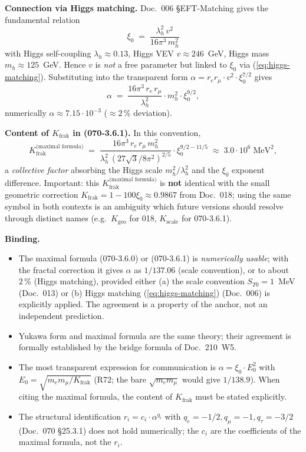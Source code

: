 \textbf{Connection via Higgs matching.}
Doc.~006 §EFT-Matching gives the fundamental relation
\begin{equation}
  \xi_0 \;=\; \frac{\lambda_h^2\, v^2}{16\pi^3\, m_h^2}
  \label{eq:higgs-matching}
\end{equation}
with Higgs self-coupling $\lambda_h \approx 0.13$, Higgs VEV
$v \approx 246$~GeV, Higgs mass $m_h \approx 125$~GeV. Hence $v$ is
\emph{not} a free parameter but linked to $\xi_0$ via
(\ref{eq:higgs-matching}). Substituting into the transparent form
$\alpha = r_e r_\mu \cdot v^2 \cdot \xi_0^{7/2}$ gives
\begin{equation}
  \alpha \;=\;
  \frac{16\pi^3\,r_e\,r_\mu}{\lambda_h^2}
  \cdot m_h^2 \cdot \xi_0^{9/2},
\end{equation}
numerically $\alpha \approx 7.15\cdot 10^{-3}$ ($\approx 2\,\%$ deviation).

\textbf{Content of $K_{\text{frak}}$ in (070-3.6.1).}
In this convention,
\begin{equation}
  K_{\text{frak}}^{\text{(maximal formula)}}
  \;=\;
  \frac{16\pi^3\,r_e\,r_\mu\,m_h^2}{\lambda_h^2\,(27\sqrt{3}/8\pi^2)^{2/5}}
  \cdot \xi_0^{9/2 - 11/5}
  \;\approx\; 3.0 \cdot 10^{6}\;\text{MeV}^2,
\end{equation}
a \emph{collective factor} absorbing the Higgs scale
$m_h^2/\lambda_h^2$ and the $\xi_0$ exponent difference. Important:
this $K_{\text{frak}}^{\text{(maximal formula)}}$ is \textbf{not}
identical with the small geometric correction
$K_{\text{frak}} = 1 - 100\xi_0 \approx 0.9867$ from Doc.~018; using
the same symbol in both contexts is an ambiguity which future
versions should resolve through distinct names (e.g.\
$K_{\text{geo}}$ for 018, $K_{\text{scale}}$ for 070-3.6.1).

\textbf{Binding.}
\begin{itemize}[leftmargin=2em,itemsep=2pt,topsep=2pt]
  \item The maximal formula (070-3.6.0) or (070-3.6.1) is
        \emph{numerically usable}; with the fractal correction it gives
        $\alpha$ as $1/137.06$ (scale convention), or to about $2\,\%$
        (Higgs matching), provided either (a) the scale convention $S_{T0} = 1$~MeV
        (Doc.~013) or (b) Higgs matching (\ref{eq:higgs-matching})
        (Doc.~006) is explicitly applied. The agreement is a property of
        the anchor, not an independent prediction.
  \item Yukawa form and maximal formula are the same theory; their
        agreement is formally established by the bridge formula of
        Doc.~210~W5.
  \item The most transparent expression for communication is
        $\alpha = \xi_0 \cdot E_0^2$ with
        $E_0 = \sqrt{m_e m_\mu/K_{\text{frak}}}$ (R72; the bare $\sqrt{m_e m_\mu}$ would give $1/138.9$). When citing the maximal formula,
        the content of $K_{\text{frak}}$ must be stated explicitly.
  \item The structural identification
        $r_i = c_i \cdot \alpha^{q_i}$ with
        $q_e = -1/2, q_\mu = -1, q_\tau = -3/2$ (Doc.~070 §25.3.1)
        does not hold numerically; the $c_i$ are the coefficients of
        the maximal formula, not the $r_i$.
\end{itemize}

